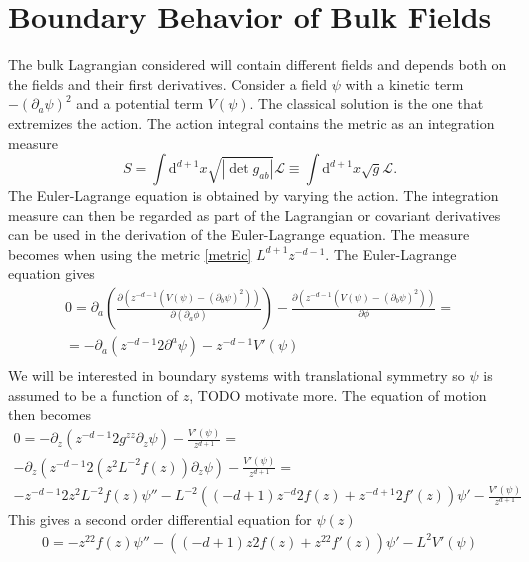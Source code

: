 \documentclass[12pt]{report}
\renewcommand{\d}{\ensuremath{\mathrm{d}}}
\renewcommand{\L}{\ensuremath{\mathcal{L}}}
\newcommand{\At}{\ensuremath{{\phi}}}
\begin{document}
\section{Boundary Behavior of Bulk Fields}
The bulk Lagrangian considered will contain different fields and depends both on the fields and their first derivatives. Consider a field $\psi$ with a kinetic term $-(\partial_a\psi)^2$ and a potential term $V(\psi)$. The classical solution is the one that extremizes the action. The action integral contains the metric as an integration measure
\begin{equation}
 S=\int\d^{d+1} x\sqrt{|\det g_{ab}|}\L\equiv\int\d^{d+1} x\sqrt{g}\L.
\end{equation}
The Euler-Lagrange equation is obtained by varying the action. The integration measure can then be regarded as part of the Lagrangian or covariant derivatives can be used in the derivation of the Euler-Lagrange equation. The measure becomes when using the metric \eqref{metric} $L^{d+1}z^{-d-1}$. The Euler-Lagrange equation gives
\begin{equation}
\begin{split}
 0=\partial_a\left(\frac{\partial (z^{-d-1}(V(\psi)-(\partial_b\psi)^2)) }{\partial(\partial_a\At)}\right)-\frac{\partial  (z^{-d-1}(V(\psi)-(\partial_b\psi)^2) )}{\partial\At}=\\
 =-\partial_a\left(z^{-d-1}2\partial^a\psi\right)-z^{-d-1}V'(\psi)\\
\end{split}
\end{equation}
We will be interested in boundary systems with translational symmetry so $\psi$ is assumed to be a function of $z$, TODO motivate more. The equation of motion then becomes
\begin{equation}
\begin{split}
0=-\partial_z\left(z^{-d-1}2g^{zz}\partial_z\psi\right)  -\frac{V'(\psi)}{z^{d+1}}=\\
-\partial_z\left(z^{-d-1}2(z^2L^{-2}f(z))\partial_z\psi\right)  -\frac{V'(\psi)}{z^{d+1}}=\\
-z^{-d-1}2z^2L^{-2}f(z)\psi''-L^{-2}\left((-d+1)z^{-d}2f(z) + z^{-d+1}2f'(z)\right)\psi' -\frac{V'(\psi)}{z^{d+1}}
\end{split}
\end{equation}
This gives a second order differential equation for $\psi(z)$
\begin{equation}
\begin{split}
0=-z^22f(z)\psi''-\left((-d+1)z2f(z) + z^22f'(z)\right)\psi' -L^2V'(\psi)
\end{split}
\end{equation}
\end{document}
